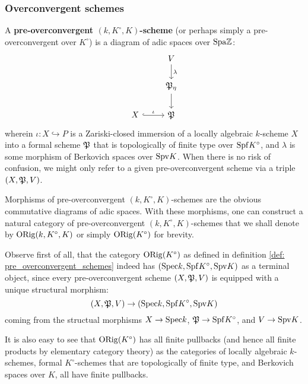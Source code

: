         \subsubsection{Overconvergent schemes}
            \begin{definition} \label{def: pre_overconvergent_schemes}
                A \textbf{pre-overconvergent $(k, K^{\circ}, K)$-scheme} (or perhaps simply a pre-overconvergent over $K^{\circ}$) is a diagram of adic spaces over $\mathrm{Spa} \mathbb{Z}$:
                    $$
                        \begin{tikzcd}
                        	& V \\
                        	& {\frakP_{\eta}} \\
                        	X & {\frakP}
                        	\arrow["\iota", hook, from=3-1, to=3-2]
                        	\arrow["\lambda", from=1-2, to=2-2]
                        	\arrow[from=2-2, to=3-2]
                        \end{tikzcd}
                    $$
                wherein $\iota: X \hookrightarrow P$ is a Zariski-closed immersion of a locally algebraic $k$-scheme $X$ into a formal scheme $\mathfrak{P}$ that is topologically of finite type over $\mathrm{Spf} K^{\circ}$, and $\lambda$ is some morphism of Berkovich spaces over $\mathrm{Spv} K$. When there is no risk of confusion, we might only refer to a given pre-overconvergent scheme via a triple $(X, \mathfrak{P}, V)$. 
                
                Morphisms of pre-overconvergent $(k, K^{\circ}, K)$-schemes are the obvious commutative diagrams of adic spaces. With these morphisms, one can construct a natural category of pre-overconvergent $(k, K^{\circ}, K)$-schemes that we shall denote by $\mathrm{ORig}(k, K^{\circ}, K)$ or simply $\mathrm{ORig}(K^{\circ})$ for brevity.
            \end{definition}
            \begin{remark}
                Observe first of all, that the category $\mathrm{ORig}(K^{\circ})$ as defined in definition \ref{def: pre_overconvergent_schemes} indeed has $(\mathrm{Spec} k, \mathrm{Spf} K^{\circ}, \mathrm{Spv} K)$ as a terminal object, since every pre-overconvergent scheme $(X, \mathfrak{P}, V)$ is equipped with a unique structural morphism:
                    $$(X, \mathfrak{P}, V) \to (\mathrm{Spec} k, \mathrm{Spf} K^{\circ}, \mathrm{Spv} K)$$
                coming from the structual morphisms $X \to \mathrm{Spec} k$, $\mathfrak{P} \to \mathrm{Spf} K^{\circ}$, and $V \to \mathrm{Spv} K$.
                
                It is also easy to see that $\mathrm{ORig}(K^{\circ})$ has all finite pullbacks (and hence all finite products by elementary category theory) as the categories of locally algebraic $k$-schemes, formal $K^{\circ}$-schemes that are topologically of finite type, and Berkovich spaces over $K$, all have finite pullbacks.
            \end{remark}
